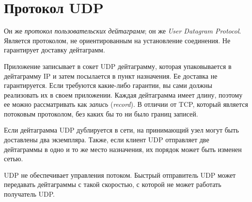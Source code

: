 
\section{Протокол UDP}
\label{sec:udp}
Он же \emph{протокол пользовательских дейтаграмм}; он же \emph{User Datagram Protocol}. Является протоколом, не ориентированным на установление соединения. Не гарантирует доставку дейтаграмм.

Приложение записывает в сокет UDP дейтаграмму, которая упаковывается в дейтаграмму IP и затем посылается в пункт назначения. Ее доставка не гарантируется. Если требуются какие-либо гарантии, вы сами должны реализовать их в своем приложении. Каждая дейтаграмма имеет длину, поэтому ее можно рассматривать как \emph{запись} (\emph{record}). В отличии от TCP, который является потоковым протоколом, без каких бы то ни было границ записей.

Если дейтаграмма UDP дублируется в сети, на принимающий узел могут быть доставлены два экземпляра. Также, если клиент UDP отправляет две дейтаграммы в одно и то же место назначения, их порядок может быть изменен сетью.

UDP не обеспечивает управления потоком. Быстрый отправитель UDP может передавать дейтаграммы с такой скоростью, с которой не может работать получатель UDP.
